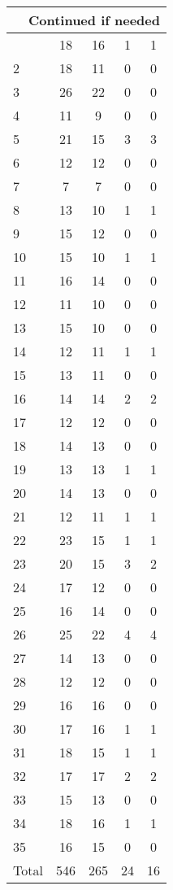 \begin{center}
\begin{longtable}{l|c|c|c|c}
\hline \multicolumn{5}{|r|}{{Continued if needed}} \\ \hline
\endfoot 
1 & 18 & 16 & 1 & 1\\ \hline
2 & 18 & 11 & 0 & 0\\ \hline
3 & 26 & 22 & 0 & 0\\ \hline
4 & 11 & 9 & 0 & 0\\ \hline
5 & 21 & 15 & 3 & 3\\ \hline
6 & 12 & 12 & 0 & 0\\ \hline
7 & 7 & 7 & 0 & 0\\ \hline
8 & 13 & 10 & 1 & 1\\ \hline
9 & 15 & 12 & 0 & 0\\ \hline
10 & 15 & 10 & 1 & 1\\ \hline
11 & 16 & 14 & 0 & 0\\ \hline
12 & 11 & 10 & 0 & 0\\ \hline
13 & 15 & 10 & 0 & 0\\ \hline
14 & 12 & 11 & 1 & 1\\ \hline
15 & 13 & 11 & 0 & 0\\ \hline
16 & 14 & 14 & 2 & 2\\ \hline
17 & 12 & 12 & 0 & 0\\ \hline
18 & 14 & 13 & 0 & 0\\ \hline
19 & 13 & 13 & 1 & 1\\ \hline
20 & 14 & 13 & 0 & 0\\ \hline
21 & 12 & 11 & 1 & 1\\ \hline
22 & 23 & 15 & 1 & 1\\ \hline
23 & 20 & 15 & 3 & 2\\ \hline
24 & 17 & 12 & 0 & 0\\ \hline
25 & 16 & 14 & 0 & 0\\ \hline
26 & 25 & 22 & 4 & 4\\ \hline
27 & 14 & 13 & 0 & 0\\ \hline
28 & 12 & 12 & 0 & 0\\ \hline
29 & 16 & 16 & 0 & 0\\ \hline
30 & 17 & 16 & 1 & 1\\ \hline
31 & 18 & 15 & 1 & 1\\ \hline
32 & 17 & 17 & 2 & 2\\ \hline
33 & 15 & 13 & 0 & 0\\ \hline
34 & 18 & 16 & 1 & 1\\ \hline
35 & 16 & 15 & 0 & 0\\ \hline
\hline \hline
Total & 546 & 265 & 24 & 16




\end{longtable}
\end{center}

